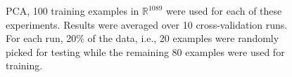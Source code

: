 \begin{figure}[t]
								\caption{PCA, 100 training examples in $\mathbb{R}^{1089}$ were used for each of these experiments. Results were averaged over 10 cross-validation runs. For each run, 20\% of the data, i.e., 20 examples were randomly picked for testing while the remaining 80 examples were used for training.}
								\label{fig:PCA_results}
								\end{figure}
								
